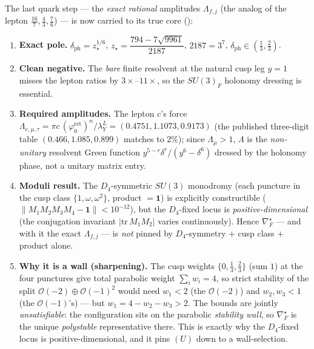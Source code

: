 \documentclass[11pt,a4paper]{article}
\newcommand{\phiz}{\varphi_0^{\mathrm{ret}}}
\theoremstyle{definition}
\begin{document}
\begin{keybox}
The last quark step --- the \emph{exact rational} amplitudes $\Lambda_{f,j}$ (the analog of the lepton
$\tfrac{16}{7},\tfrac43,\tfrac76$) --- is now carried to its true core ():
\begin{enumerate}[leftmargin=1.5em,itemsep=1pt]
\item \textbf{Exact pole.} $\delta_{\mathrm{ph}}=z_\star^{1/6}$, $z_\star=\dfrac{794-7\sqrt{9961}}{2187}$,
  $2187=3^7$, $\delta_{\mathrm{ph}}\in(\tfrac13,\tfrac23)$.
\item \textbf{Clean negative.} The \emph{bare} finite resolvent at the natural cusp leg $y{=}1$ misses the
  lepton ratios by $3\times$--$11\times$, so the $SU(3)_F$ holonomy dressing is essential.
\item \textbf{Required amplitudes.} The lepton $c$'s force
  $\Lambda_{e,\mu,\tau}=\pi c\,(\phiz)^{n}/\lambda_Y^{L}=(0.4751,1.1073,0.9173)$ (the published
  three-digit table $(0.466,1.085,0.899)$ matches to $2\%$); since $\Lambda_\mu{>}1$, $\Lambda$ is the
  \emph{non-unitary} resolvent Green function $y^{5-r}\delta^r/(y^6{-}\delta^6)$ dressed by the holonomy
  phase, not a unitary matrix entry.
\item \textbf{Moduli result.} The $D_4$-symmetric $SU(3)$ monodromy (each puncture in the cusp class
  $\{1,\omega,\omega^2\}$, product $=\mathbf1$) is explicitly constructible ($\|M_1M_2M_3M_4-\mathbf1\|<10^{-12}$),
  but the $D_4$-fixed locus is \emph{positive-dimensional} (the conjugation invariant $|\mathrm{tr}\,M_1M_2|$
  varies continuously). Hence $\nabla_F^\star$ --- and with it the exact $\Lambda_{f,j}$ --- is \emph{not}
  pinned by $D_4$-symmetry $+$ cusp class $+$ product alone.
\item \textbf{Why it is a wall (sharpening).} The cusp weights $\{0,\tfrac13,\tfrac23\}$ (sum $1$) at the
  four punctures give total parabolic weight $\sum_iw_i=4$, so strict stability of the split
  $\mathcal O(-2)\oplus\mathcal O(-1)^2$ would need $w_1{<}2$ (the $\mathcal O(-2)$) and $w_2,w_3{<}1$ (the
  $\mathcal O(-1)$'s) --- but $w_1=4-w_2-w_3>2$. The bounds are jointly \emph{unsatisfiable}: the
  configuration sits on the parabolic \emph{stability wall}, so $\nabla_F^\star$ is the unique
  \emph{polystable} representative there. This is exactly why the $D_4$-fixed locus is positive-dimensional,
  and it pins $(U)$ down to a wall-selection. 
\end{enumerate}

\end{keybox}
\end{document}
